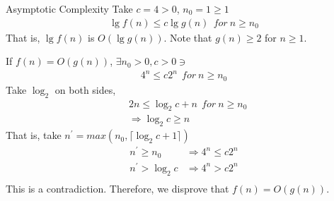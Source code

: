 \begin{homeworkProblem}{Asymptotic Complexity}
    Take $c = 4 > 0$, $n_0 = 1 \geq 1$
    \[
        \begin{split}
            \lg f(n) \leq c \lg g(n)~~for~n \geq n_0
        \end{split}
    \]
    That is, $\lg f(n)$ is $O(\lg g(n))$. Note that $g(n) \geq 2$ for $n \geq 1$.

    If $f(n) = O(g(n))$, $\exists n_0 > 0, c > 0 \ni$
    \[
        \begin{split}
            4^n \leq c 2^n~~for~n \geq n_0
        \end{split}
    \]
    Take $\log_2$ on both sides,
    \[
        \begin{split}
            &2n \leq \log_2 c + n~~for~n \geq n_0 \\
            &\Rightarrow \log_2 c \geq n
        \end{split}
    \]
    That is, take $n^{\prime} = max(n_0, \lceil \log_2 c + 1 \rceil)$
    \[
        \begin{split}
            n^{\prime} \geq n_0 &\Rightarrow 4^n \leq c 2^n \\
            n^{\prime} > \log_2 c &\Rightarrow 4^n > c 2^n \\
        \end{split}
    \]
    This is a contradiction. Therefore, we disprove that $f(n) = O(g(n))$.

\end{homeworkProblem}

\pagebreak

